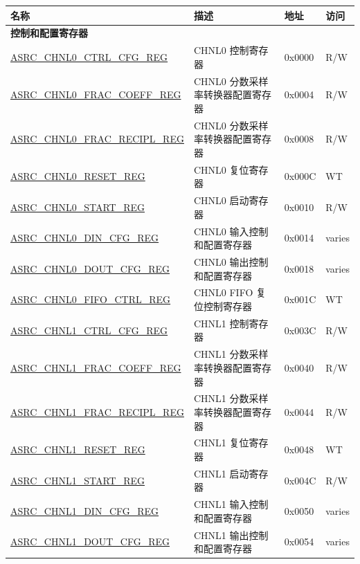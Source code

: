 \begin{longtable}{ | p{6cm} | p{6.5cm} | p{1.3cm} | p{1.7cm} | }
\hline\rowcolor{lightgray}
名称 & 描述 & 地址 & 访问 \\ \hline
\endhead
\multicolumn{4}{|l|}{\textbf{控制和配置寄存器}} \\ \hline
\hyperref[regdesc:ASRCCHNL0CTRLCFGREG]{ASRC\_CHNL0\_CTRL\_CFG\_REG} & CHNL0 控制寄存器 & 0x0000 & R/W \\ \hline
\hyperref[regdesc:ASRCCHNL0FRACCOEFFREG]{ASRC\_CHNL0\_FRAC\_COEFF\_REG} & CHNL0 分数采样率转换器配置寄存器 & 0x0004 & R/W \\ \hline
\hyperref[regdesc:ASRCCHNL0FRACRECIPLREG]{ASRC\_CHNL0\_FRAC\_RECIPL\_REG} & CHNL0 分数采样率转换器配置寄存器 & 0x0008 & R/W \\ \hline
\hyperref[regdesc:ASRCCHNL0RESETREG]{ASRC\_CHNL0\_RESET\_REG} & CHNL0 复位寄存器 & 0x000C & WT \\ \hline
\hyperref[regdesc:ASRCCHNL0STARTREG]{ASRC\_CHNL0\_START\_REG} & CHNL0 启动寄存器 & 0x0010 & R/W \\ \hline
\hyperref[regdesc:ASRCCHNL0DINCFGREG]{ASRC\_CHNL0\_DIN\_CFG\_REG} & CHNL0 输入控制和配置寄存器 & 0x0014 & varies \\ \hline
\hyperref[regdesc:ASRCCHNL0DOUTCFGREG]{ASRC\_CHNL0\_DOUT\_CFG\_REG} & CHNL0 输出控制和配置寄存器 & 0x0018 & varies \\ \hline
\hyperref[regdesc:ASRCCHNL0FIFOCTRLREG]{ASRC\_CHNL0\_FIFO\_CTRL\_REG} & CHNL0 FIFO 复位控制寄存器 & 0x001C & WT \\ \hline
\hyperref[regdesc:ASRCCHNL1CTRLCFGREG]{ASRC\_CHNL1\_CTRL\_CFG\_REG} & CHNL1 控制寄存器 & 0x003C & R/W \\ \hline
\hyperref[regdesc:ASRCCHNL1FRACCOEFFREG]{ASRC\_CHNL1\_FRAC\_COEFF\_REG} & CHNL1 分数采样率转换器配置寄存器 & 0x0040 & R/W \\ \hline
\hyperref[regdesc:ASRCCHNL1FRACRECIPLREG]{ASRC\_CHNL1\_FRAC\_RECIPL\_REG} & CHNL1 分数采样率转换器配置寄存器 & 0x0044 & R/W \\ \hline
\hyperref[regdesc:ASRCCHNL1RESETREG]{ASRC\_CHNL1\_RESET\_REG} & CHNL1 复位寄存器 & 0x0048 & WT \\ \hline
\hyperref[regdesc:ASRCCHNL1STARTREG]{ASRC\_CHNL1\_START\_REG} & CHNL1 启动寄存器 & 0x004C & R/W \\ \hline
\hyperref[regdesc:ASRCCHNL1DINCFGREG]{ASRC\_CHNL1\_DIN\_CFG\_REG} & CHNL1 输入控制和配置寄存器 & 0x0050 & varies \\ \hline
\hyperref[regdesc:ASRCCHNL1DOUTCFGREG]{ASRC\_CHNL1\_DOUT\_CFG\_REG} & CHNL1 输出控制和配置寄存器 & 0x0054 & varies \\ \hline

\end{longtable}
